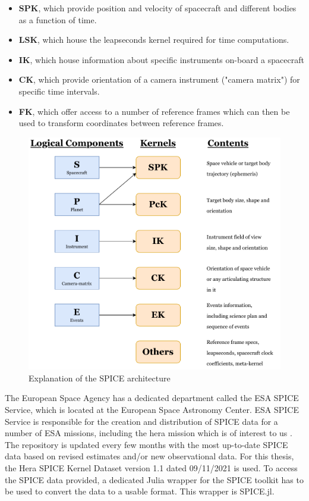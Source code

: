 \begin{itemize}
	\item \textbf{SPK}, which provide position and velocity of spacecraft and different bodies as a function of time.
	\item \textbf{LSK}, which house the leapseconds kernel required for time computations. 
	\item \textbf{IK}, which house information about specific instruments on-board a spacecraft
	\item \textbf{CK}, which provide orientation of a camera instrument ("camera matrix") for specific time intervals.
	\item \textbf{FK}, which offer access to a number of reference frames which can then be used to transform coordinates between reference frames.
\end{itemize}

\begin{figure}[h]
	\centering
	\includegraphics[width=\textwidth]{Figures/Chapter2/spice_components.pdf}
	\caption{Explanation of the SPICE architecture \cite{SPICE}}
	\label{fig:spice_components}
\end{figure}

The European Space Agency has a dedicated department called the ESA SPICE Service, which is located at the European Space Astronomy Center. ESA SPICE Service is responsible for the creation and distribution of SPICE data for a number of ESA missions, including the hera mission which is of interest to us \cite{esa-spice-hera}. The repository is updated every few months with the most up-to-date SPICE data based on revised estimates and/or new observational data. For this thesis, the Hera SPICE Kernel Dataset version 1.1 dated 09/11/2021 is used. To access the SPICE data provided, a dedicated Julia wrapper for the SPICE toolkit has to be used to convert the data to a usable format. This wrapper is SPICE.jl.  

